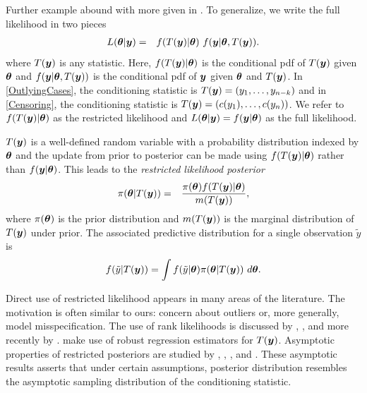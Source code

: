 \documentclass[11pt]{article}
\def\bth{\mbox{\boldmath $\theta$}}
\newcommand{\by}{\mbox{\boldmath $y$}}
\begin{document}
Further example abound with more given in \cite{lewis2014}. To generalize, we write the full likelihood in two pieces
\begin{eqnarray}
\label{FullLikelihood}
L(\bth | \by)  & = & f(T(\by) | \bth) \,\, f(\by |\bth, T(\by)) .  
\end{eqnarray}
where $T(\by)$ is any statistic. Here,  $f(T(\by) | \bth)$ is the conditional pdf of $T(\by)$ given $\bth$ and $f(\by |\bth, T(\by))$ is the conditional pdf of $\by$ given $\bth$ and $T(\by)$.  In \eqref{OutlyingCases}, the conditioning statistic is $T(\by) = (y_1, \ldots, y_{n-k})$ and in \eqref{Censoring}, the conditioning statistic is $T(\by) = (c(y_1),\ldots,c(y_n))$.  We refer to 
$f(T(\by) | \bth)$ as the restricted likelihood and $L(\bth | \by)=f(\by|\bth)$ as the full likelihood.  

$T(\by)$ is a well-defined random variable with a probability distribution indexed by $\bth$ and the update from prior  to posterior can be made using $f(T(\by)|\bth)$ rather than $f(\by|\bth)$.  This leads to the \textit{restricted likelihood posterior}
\begin{eqnarray}
\label{RestrictedPosterior}
\pi(\bth | T(\by)) & = & \frac{\pi(\bth) f(T(\by) | \bth)}{m(T(\by))} ,
\end{eqnarray}
where $\pi(\bth)$ is the prior distribution and $m(T(\by))$ is the marginal distribution of $T(\by)$ under prior. The associated predictive distribution for a single observation $\tilde y$ is
\begin{eqnarray}
\label{RestrictedpredDist}
f(\tilde y | T(\by)) = \int f(\tilde y | \bth) \pi(\bth | T(\by))\ d\bth .  
\end{eqnarray}

Direct use of restricted likelihood appears in many areas of the literature.  The motivation is often similar to ours:   
concern about outliers or, more generally, model misspecification.  The use of rank likelihoods is discussed by \cite{savage1969}, \cite{pettitt1983, pettitt1982}, and more recently by \cite{hoff2013}.  \cite{lewis2012} make use of robust regression estimators for $T(\by)$.
Asymptotic properties of restricted posteriors are studied by \cite{doksum1990}, \cite{clarke1995}, \cite{yuan2004},  and \cite{hwang2005}. These asymptotic results asserts that under certain assumptions, posterior distribution resembles the asymptotic sampling distribution of the conditioning statistic.  
\end{document}

